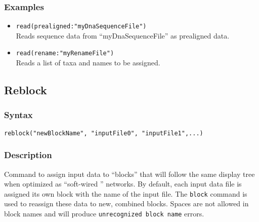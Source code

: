 \documentclass[11pt]{article}
\begin{document}
		\subsubsection{Examples}
				\begin{itemize}
					\item{\texttt{read(prealigned:"myDnaSequenceFile")}\\ Reads sequence data from ``myDnaSequenceFile'' as prealigned data.}
					\item{\texttt{read(rename:"myRenameFile")}\\ Reads a list of taxa and names to be assigned.}  
			\end{itemize}

	\subsection{Reblock}
	\subsubsection{Syntax}
	\texttt{reblock("newBlockName", "inputFile0", "inputFile1",...)}
	\subsubsection{Description}
	Command to assign input data to ``blocks'' that will follow the same display tree when optimized
	as ``soft-wired '' networks.  By default, each input data file is assigned its own block with the name
	of the input file.  The \texttt{block} command is used to reassign these data to new, combined blocks.
	Spaces are not allowed in block names and will produce \texttt{unrecognized block name} errors.    
\end{document}
